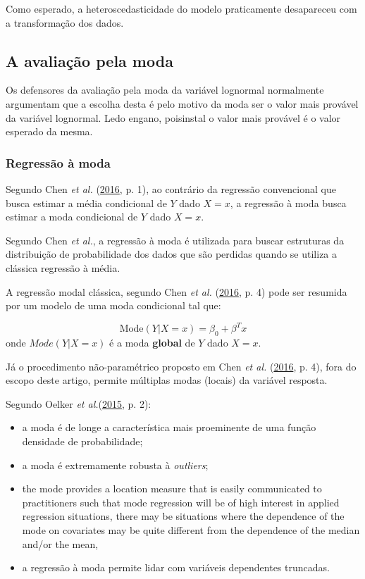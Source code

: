 \documentclass[a4paper, 12pt]{article}
\providecommand{\tightlist}{%
  \setlength{\itemsep}{0pt}\setlength{\parskip}{0pt}}
\begin{document}
Como esperado, a heteroscedasticidade do modelo praticamente desapareceu
com a transformação dos dados.

\subsection{A avaliação pela moda}\label{a-avaliacao-pela-moda}

Os defensores da avaliação pela moda da variável lognormal normalmente
argumentam que a escolha desta é pelo motivo da moda ser o valor mais
provável da variável lognormal. Ledo engano, poisinstal o valor mais
provável é o valor esperado da mesma.

\subsubsection{Regressão à moda}\label{regressao-a-moda}

Segundo Chen \emph{et al.} (\protect\hyperlink{ref-chen2016}{2016}, p.
1), ao contrário da regressão convencional que busca estimar a média
condicional de \(Y\) dado \(X = x\), a regressão à moda busca estimar a
moda condicional de \(Y\) dado \(X=x\).

Segundo Chen \emph{et al.}, a regressão à moda é utilizada para buscar
estruturas da distribuição de probabilidade dos dados que são perdidas
quando se utiliza a clássica regressão à média.

A regressão modal clássica, segundo Chen \emph{et al.}
(\protect\hyperlink{ref-chen2016}{2016}, p. 4) pode ser resumida por um
modelo de uma moda condicional tal que:

\[\text{Mode}(Y|X=x) = \beta_0 + \beta^Tx\] onde \(Mode(Y|X=x)\) é a
moda \textbf{global} de \(Y\) dado \(X = x\).

Já o procedimento não-paramétrico proposto em Chen \emph{et al.}
(\protect\hyperlink{ref-chen2016}{2016}, p. 4), fora do escopo deste
artigo, permite múltiplas modas (locais) da variável resposta.

Segundo Oelker \emph{et al.}(\protect\hyperlink{ref-oelker}{2015}, p.
2):

\begin{itemize}
\tightlist
\item
  a moda é de longe a característica mais proeminente de uma função
  densidade de probabilidade;
\item
  a moda é extremamente robusta à \emph{outliers};
\item
  the mode provides a location measure that is easily communicated to
  practitioners such that mode regression will be of high interest in
  applied regression situations, there may be situations where the
  dependence of the mode on covariates may be quite different from the
  dependence of the median and/or the mean,
\item
  a regressão à moda permite lidar com variáveis dependentes truncadas.
\end{itemize}
\end{document}
